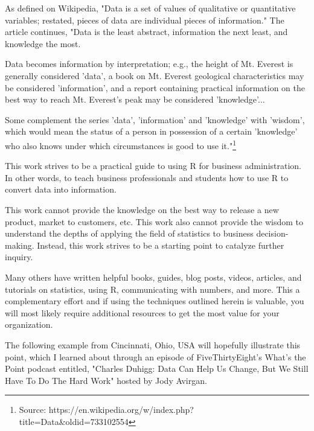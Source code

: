 %
%
%
%
% 

As defined on Wikipedia, "Data is a set of values of qualitative or quantitative variables; restated, pieces of data are individual pieces of information." The article continues, "Data is the least abstract, information the next least, and knowledge the most.

Data becomes information by interpretation; e.g., the height of Mt. Everest is generally considered 'data', a book on Mt. Everest geological characteristics may be considered 'information', and a report containing practical information on the best way to reach Mt. Everest's peak may be considered 'knowledge'...

Some complement the series 'data', 'information' and 'knowledge' with 'wisdom', which would mean the status of a person in possession of a certain 'knowledge' who also knows under which circumstances is good to use it."\footnote{Source: https://en.wikipedia.org/w/index.php?title=Data&oldid=733102554}

This work strives to be a practical guide to using R for business 
administration. In other words, to teach business professionals and students how to use R to convert data into information.

This work cannot provide the knowledge on the best way to release a new product, market to customers, etc. This work also cannot provide the wisdom to understand the depths of applying the field of statistics to business decision-making. Instead, this work strives to be a starting point to catalyze further inquiry.

Many others have written helpful books, guides, blog posts, videos, articles, and tutorials on statistics, using R, communicating with numbers, and more. This a complementary effort and if using the techniques outlined herein is valuable, you will most likely require additional resources to get the most value for your organization.

The following example from Cincinnati, Ohio, USA will hopefully illustrate this point, which I learned about through an episode of FiveThirtyEight's What's the Point podcast entitled, "Charles Duhigg: Data Can Help Us Change, But We Still Have To Do The Hard Work" hosted by Jody Avirgan. 

